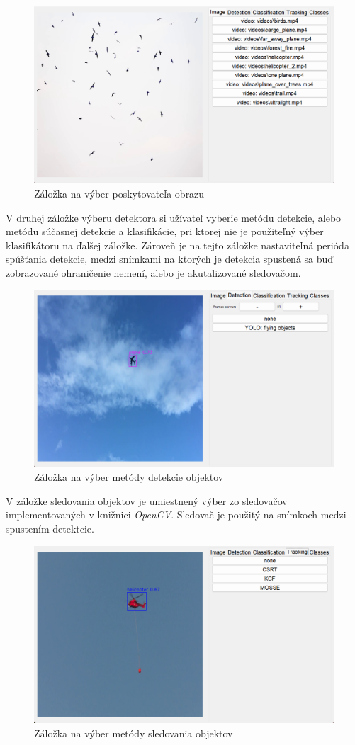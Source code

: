         \begin{figure}[H]
            \centering
            \includegraphics[width=.7\textwidth]{obrazky/app/image_provider.png}
            \caption{Záložka na výber poskytovateľa obrazu}
        \end{figure}

        V druhej záložke výberu detektora si užívateľ vyberie metódu detekcie, alebo metódu súčasnej detekcie a klasifikácie, pri ktorej nie je použiteľný výber klasifikátoru na ďalšej záložke. Zároveň je na tejto záložke nastaviteľná perióda spúšťania detekcie, medzi snímkami na ktorých je detekcia spustená sa buď zobrazované ohraničenie nemení, alebo je akutalizované sledovačom.

        \begin{figure}[H]
            \centering
            \includegraphics[width=.7\textwidth]{obrazky/app/detector.png}
            \caption{Záložka na výber metódy detekcie objektov}
        \end{figure}

        V záložke sledovania objektov je umiestnený výber zo sledovačov implementovaných v knižnici \emph{OpenCV}. Sledovač je použitý na snímkoch medzi spustením detektcie.

        \begin{figure}[H]
            \centering
            \includegraphics[width=.7\textwidth]{obrazky/app/tracker.png}
            \caption{Záložka na výber metódy sledovania objektov}
        \end{figure}

